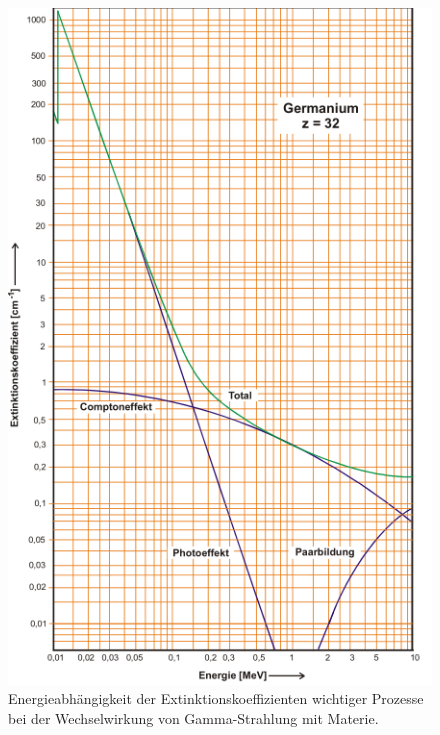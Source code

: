 \FloatBarrier
\begin{figure}
  \includegraphics[width=\textwidth]{content/skizzen/extinktion.PNG}
  \caption{Energieabhängigkeit der Extinktionskoeffizienten wichtiger Prozesse bei der Wechselwirkung von Gamma-Strahlung mit Materie.}
  \label{fig:extinktion}
\end{figure}
\FloatBarrier

